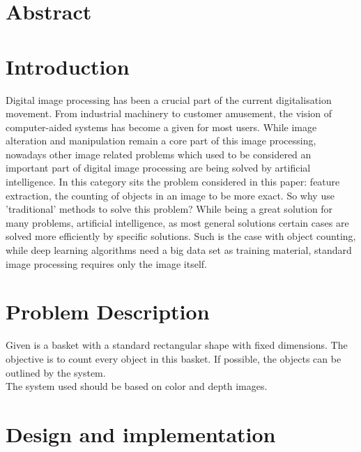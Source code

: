 \documentclass[11pt]{article}
\begin{document}


\section*{Abstract}
\thispagestyle{empty}

\newpage
\tableofcontents
\thispagestyle{empty}

\newpage
\listoftables
\thispagestyle{empty}

\newpage
\listoffigures
\thispagestyle{empty}

\newpage
\section{Introduction}
Digital image processing has been a crucial part of the current digitalisation movement. From industrial machinery to customer amusement, the vision of computer-aided systems has become a given for most users. While image alteration and manipulation remain a core part of this image processing, nowadays other image related problems which used to be considered an important part of digital image processing are being solved by artificial intelligence. In this category sits the problem considered in this paper: feature extraction, the counting of objects in an image to be more exact. So why use 'traditional' methods to solve this problem? While being a great solution for many problems, artificial intelligence, as most general solutions certain cases are solved more efficiently by specific solutions. Such is the case with object counting, while deep learning algorithms need a big data set  as training material, standard image processing requires only the image itself.

\section{Problem Description}

\hspace{\parindent} Given is a basket with a standard rectangular shape with fixed dimensions. The objective is to count every object in this basket. If possible, the objects can be outlined by the system.\\

\noindent The system used should be based on color and depth images.


\section{Design and implementation}
\end{document}
